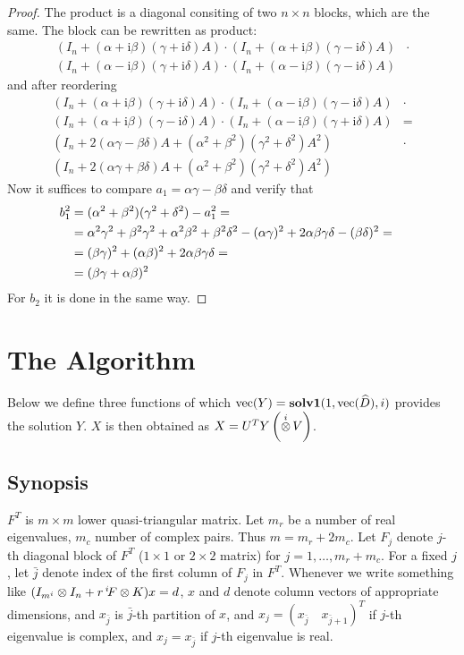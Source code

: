 \documentclass[11pt,a4paper]{article}
\begin{document}
\begin{proof}
The product is a diagonal consiting of two $n\times n$ blocks, which are the
same. The block can be rewritten as product:
\begin{align*}
(I_n+(\alpha+\mathrm i\beta)(\gamma+\mathrm i\delta)A)\cdot
(I_n+(\alpha+\mathrm i\beta)(\gamma-\mathrm i\delta)A)&\cdot\\
(I_n+(\alpha-\mathrm i\beta)(\gamma+\mathrm i\delta)A)\cdot
(I_n+(\alpha-\mathrm i\beta)(\gamma-\mathrm i\delta)A)&
\end{align*}
and after reordering
\begin{align*}
(I_n+(\alpha+\mathrm i\beta)(\gamma+\mathrm i\delta)A)\cdot
(I_n+(\alpha-\mathrm i\beta)(\gamma-\mathrm i\delta)A)&\cdot\\
(I_n+(\alpha+\mathrm i\beta)(\gamma-\mathrm i\delta)A)\cdot
(I_n+(\alpha-\mathrm i\beta)(\gamma+\mathrm i\delta)A)&=\\
(I_n+2(\alpha\gamma-\beta\delta)A+
(\alpha^2+\beta^2)(\gamma^2+\delta^2)A^2)&\cdot\\
(I_n+2(\alpha\gamma+\beta\delta)A+
(\alpha^2+\beta^2)(\gamma^2+\delta^2)A^2)&
\end{align*}
Now it suffices to compare $a_1=\alpha\gamma-\beta\delta$ and verify
that
\begin{align*}
b_1^2 & = (\alpha^2+\beta^2)(\gamma^2+\delta^2)-a_1^2 =\cr
      & = \alpha^2\gamma^2+\beta^2\gamma^2+\alpha^2\beta^2+\beta^2\delta^2-
          (\alpha\gamma)^2+2\alpha\beta\gamma\delta-(\beta\delta)^2=\cr
      & = (\beta\gamma)^2 + (\alpha\beta)^2 + 2\alpha\beta\gamma\delta=\cr
      & = (\beta\gamma +\alpha\beta)^2
\end{align*}
For $b_2$ it is done in the same way.
\end{proof}

\section{The Algorithm}

Below we define three functions of which
$\mathop{\hbox{vec}}(Y)=\mathbf{solv1}(1,\mathop{\hbox{vec}}(\widehat{D}),i)$ provides the solution $Y$. $X$
is then obtained as $X=U^TY\left(\mathop{\overset{i}{\otimes}} V\right)$.

\subsection{Synopsis}

$F^T$ is $m\times m$ lower quasi-triangular matrix. Let $m_r$ be a
number of real eigenvalues, $m_c$ number of complex pairs. Thus
$m=m_r+2m_c$. Let $F_j$ denote
$j$-th diagonal block of $F^T$ ($1\times 1$ or $2\times 2$ matrix) for
$j=1,\ldots, m_r+m_c$. For a fixed $j$, let $\bar j$ denote index of the
first column of $F_j$ in $F^T$. Whenever we write something like
$(I_{m^i}\otimes I_n+r\,^i\!F\otimes K)x = d$, $x$ and $d$ denote column
vectors of appropriate dimensions, and $x_{\bar j}$ is $\bar j$-th
partition of $x$, and $x_j=(x_{\bar j}\quad x_{\bar j+1})^T$ if $j$-th
eigenvalue is complex, and $x_j=x_{\bar j}$ if $j$-th eigenvalue is real.
\end{document}
